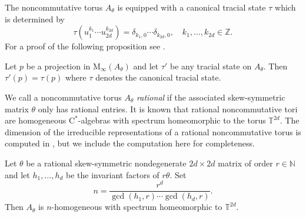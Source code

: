 \documentclass[reqno, a4paper]{amsart}
\numberwithin{equation}{section}
\newcommand{\N}{\mathbb{N}}   %
\newcommand{\Z}{\mathbb{Z}}   %
\newcommand{\T}{\mathbb{T}}   %
\newcommand{\ca}{$\mathrm{C}^*$-algebra}
\begin{document}
The noncommutative torus $A_\theta$ is equipped with a canonical tracial state $\tau$ which is determined by
\[ 
\tau( u_1^{k_1} \cdots u_{2d}^{k_{2d}}) = \delta_{k_1,0} \cdots \delta_{k_{2d},0} , \quad k_1, \ldots, k_{2d} \in \Z. 
\]
For a proof of the following proposition see \cite[Lemma~2.3]{el84}.

\begin{proposition}
\label{prop:traces-on-torus}
Let $p$ be a projection in $\mathrm{M}_\infty(A_\theta)$ and let $\tau'$ be any tracial state on $A_\theta$. Then $\tau'(p) = \tau(p)$ where $\tau$ denotes the canonical tracial state.
\end{proposition}

We call a noncommutative torus $A_\theta$ \emph{rational} if the associated skew-symmetric matrix $\theta$ only has rational entries. 
It is known that rational noncommutative tori are homogeneous \ca{s} with spectrum homeomorphic to the torus $\T^{2d}$.
The dimension of the irreducible representations of a rational noncommutative torus is computed in \cite{vava86}, but we include the computation here for completeness.

\begin{proposition}
\label{prop:rational-torus-homogeneous}
Let $\theta$ be a rational skew-symmetric nondegenerate $2d \times 2d$ matrix of order $r \in \N$ and let $h_1, \ldots, h_d$ be the invariant factors of $r \theta$. 
Set
\begin{equation}
\label{eq:homogeneous-dimension}
n = \frac{r^d}{\gcd(h_1,r) \cdots \gcd(h_d,r)}.
\end{equation}
Then $A_\theta$ is $n$-homogeneous with spectrum homeomorphic to $\T^{2d}$.
\end{proposition}
\end{document}

